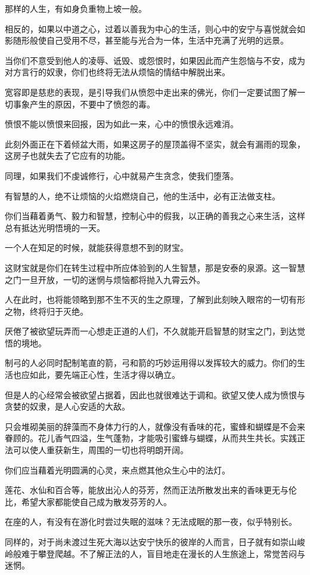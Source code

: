 \documentclass[twoside,openany]{book}
\begin{document}
那样的人生，有如身负重物上坡一般。

相反的，如果以中道之心，过着以善我为中心的生活，则心中的安宁与喜悦就会如影随形般使自己受用不尽，甚至能与光合为一体，生活中充满了光明的远景。

当你们不意受到他人的凌辱、诋毁、或怨恨时，如果因此而产生怨恼与不安，成为对方言行的奴隶，你们也终将无法从烦恼的情结中解脱出来。

宽容即是慈悲的表现，是引导我们从愤怨中走出来的佛光，你们一定要试图了解一切事象产生的原因，不要中了愤怨的毒。

愤恨不能以愤恨来回报，因为如此一来，心中的愤恨永远难消。

此刻外面正在下着倾盆大雨，如果这房子的屋顶盖得不坚实，就会有漏雨的现象，这房子也就失去了它应有的功能。

同理，如果我们不虔诚修行，心中就易产生贪念，使我们堕落。

有智慧的人，绝不让烦恼的火焰燃烧自己，他的生活中，必有正法做支柱。

你们当藉着勇气、毅力和智慧，控制心中的假我，以正确的善我之心来生活，这样总有抵达光明悟境的一天。

一个人在知足的时候，就能获得意想不到的财宝。

这财宝就是你们在转生过程中所应体验到的人生智慧，那是安泰的泉源。这一智慧之门一旦开放，一切的迷惘与烦恼都将抛入九霄云外。

人在此时，也将能领略到那不生不灭的生之原理，了解到此刻映入眼帘的一切有形之物，终将归于灭绝。

厌倦了被欲望玩弄而一心想走正道的人们，不久就能开启智慧的财宝之门，到达觉悟的境地。

制弓的人必同时配制笔直的箭，弓和箭的巧妙运用得以发挥较大的威力。你们的生活也应如此，要先端正心性，生活才得以确立。

但是人的心经常会被欲望占据着，因此也就很难达于调和。欲望又使人成为愤恨与贪婪的奴隶，是人心安适的大敌。

只会堆砌美丽的辞藻而不身体力行的人，就像没有香味的花，蜜蜂和蝴蝶是不会来眷顾的。花儿香气四溢，生气蓬勃，才能吸引蜜蜂与蝴蝶，从而共生共长。实践正法可以使人重获新生，周围的一切也将明朗开阔。

你们应当藉着光明圆满的心灵，来点燃其他众生心中的法灯。

莲花、水仙和百合等，能放出沁人的芬芳，然而正法所散发出来的香味更无与伦比，希望大家都能使自己成为散发芬芳的人。

在座的人，有没有在游化时尝过失眠的滋味？无法成眠的那一夜，似乎特别长。

同样的，对于尚未渡过生死大海以达安宁快乐的彼岸的人而言，日子就有如崇山峻岭般难于攀登爬越。不了解正法的人，盲目地走在漫长的人生旅途上，常觉苦闷与迷惘。
\end{document}
